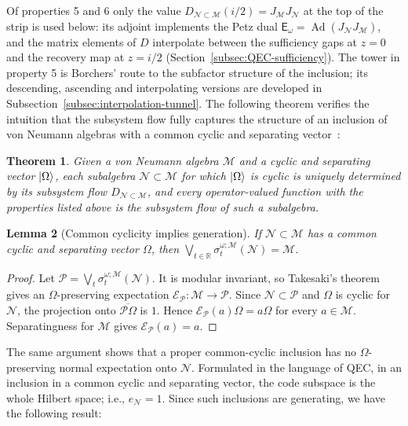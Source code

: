 \documentclass[a4paper,11pt]{article}
\newtheorem{theorem}{Theorem}
\newtheorem{lemma}[theorem]{Lemma}
\theoremstyle{definition}
\newcommand{\mP}{\mathcal{P}}
\newcommand{\mN}{\mathcal{N}}
\newcommand{\mM}{\mathcal{M}}
\newcommand{\mE}{\mathcal{E}}
\begin{document}
Of properties 5 and 6 only the value $D_{\mN\subset\mM}(i/2)=J_{\mM}J_{\mN}$ at the top of the strip is used below: its adjoint implements the Petz dual $\mathsf E_\omega=\operatorname{Ad}(J_{\mN}J_{\mM})$, and the matrix elements of $D$ interpolate between the sufficiency gaps at $z=0$ and the recovery map at $z=i/2$ (Section~\ref{subsec:QEC-sufficiency}). The tower in property 5 is Borchers' route to the subfactor structure of the inclusion; its descending, ascending and interpolating versions are developed in Subsection~\ref{subsec:interpolation-tunnel}. The following theorem verifies the intuition that the subsystem flow fully captures the structure of an inclusion of von Neumann algebras with a common cyclic and separating vector~\cite{revolutionizing}:
\begin{theorem}
    Given a von Neumann algebra $\mM$ and a cyclic and separating vector $\ket{\Omega}$, each subalgebra $\mN\subset\mM$ for which $\ket{\Omega}$ is cyclic is uniquely determined by its subsystem flow $D_{\mN\subset\mM}$, and every operator-valued function with the properties listed above is the subsystem flow of such a subalgebra.
\end{theorem}

\begin{lemma}[Common cyclicity implies generation]\label{lem:common-cyclicity-generating}
If $\mN\subset\mM$ has a common cyclic and separating vector $\Omega$, then
$\bigvee_{t\in\mathbb R}\sigma^{\omega;\mM}_t(\mN)=\mM$.
\end{lemma}
\begin{proof}
Let $\mP=\bigvee_t\sigma^{\omega;\mM}_t(\mN)$. It is modular invariant, so Takesaki's theorem
gives an $\Omega$-preserving expectation $\mE_{\mP}:\mM\to\mP$.
Since $\mN\subset\mP$ and $\Omega$ is cyclic for $\mN$, the projection onto
$\overline{\mP\Omega}$ is $1$. Hence $\mE_{\mP}(a)\Omega=a\Omega$ for every $a\in\mM$.
Separatingness for $\mM$ gives $\mE_{\mP}(a)=a$.
\end{proof}
The same argument shows that a proper common-cyclic inclusion has no
$\Omega$-preserving normal expectation onto $\mN$. Formulated in the language of QEC, in an inclusion in a common cyclic and separating vector, the code subspace is the whole Hilbert space; i.e., $e_{\mN}=1$. Since such inclusions are generating, we have the following result:
\end{document}
